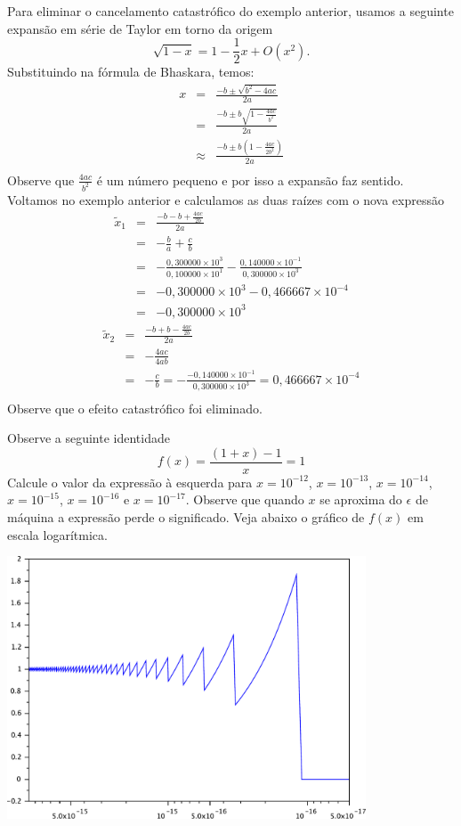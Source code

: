 \documentclass[main.tex]{subfiles}
\begin{document}
\begin{ex}Para eliminar o cancelamento catastrófico do exemplo anterior, usamos a seguinte expansão em série de Taylor em torno da origem
$$
\sqrt{1-x}=1-{\frac {1}{2}}x+O(x^2) .
$$
Substituindo na fórmula de Bhaskara, temos:
\begin{eqnarray*}
x&=&\frac{-b\pm \sqrt{b^2-4ac}}{2a}\\
&=&\frac{-b\pm b\sqrt{1-\frac{4ac}{b^2}}}{2a}\\
&\approx&\frac{-b\pm b\left(1-\frac{4ac}{2b^2}\right)}{2a}\\
\end{eqnarray*}
Observe que $\frac{4ac}{b^2}$ é um número pequeno e por isso a expansão faz sentido. Voltamos no exemplo anterior e calculamos as duas raízes com o nova expressão
\begin{eqnarray*}
\tilde{x}_1&=& \frac{-b- b+\frac{4ac}{2b}}{2a}\\
&=& -\frac{b}{a}+\frac{c}{b}\\
&=& -\frac{0,300000\times 10^{3}}{0,100000\times 10^{1}}-\frac{0,140000\times 10^{-1}}{0,300000\times 10^3}\\
&=& -0,300000\times 10^{3}-0,466667\times 10^{-4}\\
&=& -0,300000\times 10^{3}
\end{eqnarray*}
\begin{eqnarray*}
\tilde{x}_2&=& \frac{-b+ b-\frac{4ac}{2b}}{2a}\\
&=&-\frac{4ac}{4ab}\\
&=&-\frac{c}{b}=-\frac{-0,140000\times 10^{-1}}{0,300000\times 10^3}=0,466667\times 10^{-4}\\
\end{eqnarray*}
Observe que o efeito catastrófico foi eliminado.
\end{ex}
\begin{ex}Observe a seguinte identidade
$$
f(x)=\frac{(1+x)-1}{x}=1
$$
Calcule o valor da expressão à esquerda para $x=10^{-12}$, $x=10^{-13}$, $x=10^{-14}$, $x=10^{-15}$, $x=10^{-16}$ e $x=10^{-17}$. Observe que quando $x$ se aproxima do $\epsilon$ de máquina a expressão perde o significado. Veja abaixo o gráfico de $f(x)$ em escala logarítmica.

\includegraphics[width=0.8\textwidth]{./cap_aritmetica/pics/cancelamento_0}
\end{ex}
\end{document}
